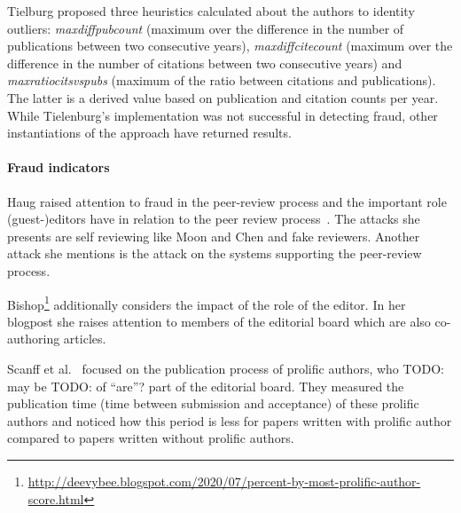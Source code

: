 \documentclass{ou-report}
\newcommand{\todo}[1]{{\color{red} TODO: #1}}
\newcommand{\outline}[1]{{\color{blue} #1}}
\begin{document}
Tielburg proposed three heuristics calculated about the authors to identity 
outliers: 
\textit{maxdiffpubcount} (maximum over the difference in the number of 
publications between two consecutive years), \textit{maxdiffcitecount} (maximum 
over the difference in the number of citations between two consecutive years) 
and \textit{maxratiocitsvspubs} (maximum of the ratio between citations and 
publications). The latter is a derived value based on publication 
and citation counts per year.
While Tielenburg's implementation was not successful
in detecting fraud, other instantiations of the approach have returned results.

\paragraph{Fraud indicators}


Haug raised attention to fraud in the peer-review process and the important role
(guest-)editors have in relation to the peer review process~\cite{Haug2015}. The 
attacks she presents are self reviewing like Moon and Chen and fake reviewers.
Another attack she mentions is the attack on the systems supporting the peer-review
process.

Bishop\footnote{\url{http://deevybee.blogspot.com/2020/07/percent-by-most-prolific-author-score.html}}
additionally considers the impact of the role of the editor.
In her blogpost she raises attention to members of the editorial board which are
also co-authoring articles.

Scanff et al.~\cite{SNCMBL2021} focused on the publication process of prolific
authors, who \todo{may be}\todo{of ``are''?} part of the editorial board. They measured the
publication time (time between submission and acceptance) of these prolific
authors and noticed how this period is less for papers written with prolific
author compared to papers written without  prolific authors. 
\end{document}

